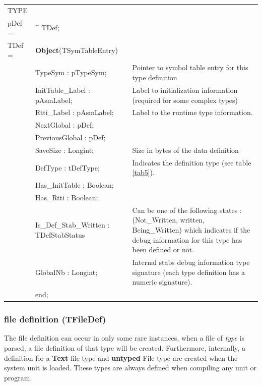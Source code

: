 \documentclass [a4paper,12pt]{article}
\begin{document}
\begin{tabular*}{6.5in}{|l@{\extracolsep{\fill}}lp{7cm}|}
\hline
\textsf{TYPE} & & \\
\xspace pDef = & \^{}  TDef; & \\
\xspace \textsf{TDef} = & \textbf{Object}(TSymTableEntry) & \\
&\textsf{TypeSym : pTypeSym;}&
    Pointer to symbol table entry for this type definition \\
&\textsf{InitTable{\_}Label : pAsmLabel;}&
    Label to initialization information (required for some complex types) \\
&\textsf{Rtti{\_}Label : pAsmLabel;}&
    Label to the runtime type information. \\
&\textsf{NextGlobal : pDef;}&  \\
&\textsf{PreviousGlobal : pDef;}&  \\
&\textsf{SaveSize : Longint;}&
    Size in bytes of the data definition \\
&\textsf{DefType : tDefType;}&
    Indicates the definition type (see table \ref{tab5}). \\
&\textsf{Has{\_}InitTable : Boolean;}&  \\
&\textsf{Has{\_}Rtti : Boolean;}&  \\
&\textsf{Is{\_}Def{\_}Stab{\_}Written : TDefStabStatus}&
    Can be one of the following states : (\textsf{Not{\_}Written,
    written, Being{\_}Written}) which indicates if the debug information
    for this type has been defined or not. \\
&\textsf{GlobalNb : Longint;}&
    Internal stabs debug information type signature (each type definition has a
    numeric signature). \\
&\textsf{end;}&  \\
\hline
\end{tabular*}

\subsubsection{file definition (TFileDef)}
\label{subsubsec:mylabel6}

The file definition can occur in only some rare instances, when a
\textsf{file of }\textsf{\textit{type}} is parsed, a file definition of that
type will be created. Furthermore, internally, a definition for a
\textbf{Text} file type and \textbf{untyped} File type are created when the
system unit is loaded. These types are always defined when compiling any
unit or program.
\end{document}
